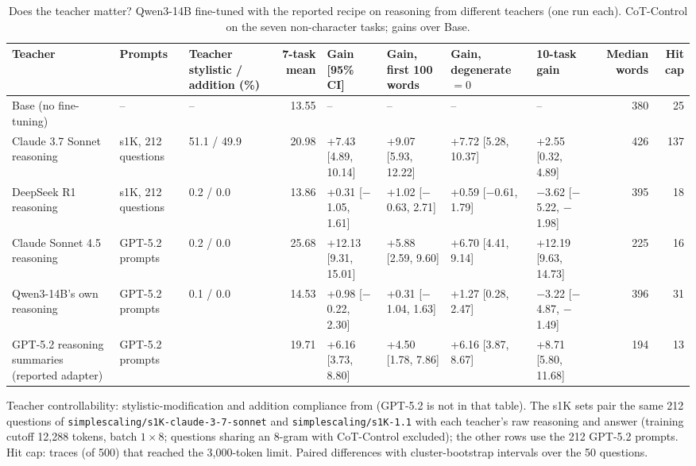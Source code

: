 \begin{table}[t]
\centering\small
\caption{Does the teacher matter? Qwen3-14B fine-tuned with the reported recipe on reasoning from different teachers (one run each). CoT-Control on the seven non-character tasks; gains over Base.}\label{tab:teacher}
\setlength{\tabcolsep}{4pt}
\begin{adjustbox}{max width=\linewidth}
\begin{tabular}{lllrllllrr}
\toprule
Teacher & Prompts & Teacher stylistic / addition (\%) & 7-task mean & Gain [95\% CI] & Gain, first 100 words & Gain, degenerate $=0$ & 10-task gain & Median words & Hit cap \\
\midrule
Base (no fine-tuning) & -- & -- & 13.55 & -- & -- & -- & -- & 380 & 25 \\
Claude 3.7 Sonnet reasoning & s1K, 212 questions & 51.1 / 49.9 & 20.98 & +7.43 [4.89, 10.14] & +9.07 [5.93, 12.22] & +7.72 [5.28, 10.37] & +2.55 [0.32, 4.89] & 426 & 137 \\
DeepSeek R1 reasoning & s1K, 212 questions & 0.2 / 0.0 & 13.86 & +0.31 [$-$1.05, 1.61] & +1.02 [$-$0.63, 2.71] & +0.59 [$-$0.61, 1.79] & $-$3.62 [$-$5.22, $-$1.98] & 395 & 18 \\
Claude Sonnet 4.5 reasoning & GPT-5.2 prompts & 0.2 / 0.0 & 25.68 & +12.13 [9.31, 15.01] & +5.88 [2.59, 9.60] & +6.70 [4.41, 9.14] & +12.19 [9.63, 14.73] & 225 & 16 \\
Qwen3-14B's own reasoning & GPT-5.2 prompts & 0.1 / 0.0 & 14.53 & +0.98 [$-$0.22, 2.30] & +0.31 [$-$1.04, 1.63] & +1.27 [0.28, 2.47] & $-$3.22 [$-$4.87, $-$1.49] & 396 & 31 \\
GPT-5.2 reasoning summaries (reported adapter) & GPT-5.2 prompts &  & 19.71 & +6.16 [3.73, 8.80] & +4.50 [1.78, 7.86] & +6.16 [3.87, 8.67] & +8.71 [5.80, 11.68] & 194 & 13 \\
\bottomrule
\end{tabular}
\end{adjustbox}
\par\smallskip\begin{minipage}{0.97\linewidth}\footnotesize Teacher controllability: stylistic-modification and addition compliance from \citet[Table 2]{chen2026cotcontrol} (GPT-5.2 is not in that table). The s1K sets pair the same 212 questions of \texttt{simplescaling/s1K-claude-3-7-sonnet} and \texttt{simplescaling/s1K-1.1} with each teacher's raw reasoning and answer (training cutoff 12,288 tokens, batch $1\times8$; questions sharing an 8-gram with CoT-Control excluded); the other rows use the 212 GPT-5.2 prompts. Hit cap: traces (of 500) that reached the 3,000-token limit. Paired differences with cluster-bootstrap intervals over the 50 questions.\end{minipage}
\end{table}
